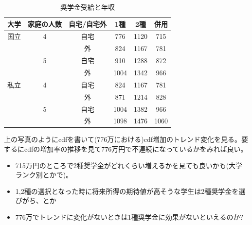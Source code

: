 \documentclass{jsarticle}
\begin{document}
\begin{table}[htb]
\begin{center}
\caption{奨学金受給と年収}
  \begin{tabular}{cccccc} \hline
   大学 & 家庭の人数 & 自宅/自宅外 & 1種    &2種      &併用 \\ \hline \hline
   国立 &      4            &自宅           & 776   & 1120   &715 \\
           &                    & 外          & 824   &1167    &781\\
           &      5            & 自宅          & 910   & 1288   &872 \\ 
           &                    & 外          & 1004 & 1342   & 966 \\  \hline
   私立 &      4            &自宅           & 824   & 1167   &781 \\
           &                    & 外          & 871   &1214    &828\\
           &      5            & 自宅          & 1004 & 1382   &966\\ 
           &                    & 外         & 1098 & 1476   &1060\\  \hline  
           \end{tabular}   
   \end{center}
\end{table}

\begin{figure}[htbp]
\begin{center}
  \end{center}
\end{figure}

上の写真のようにcdfを書いて(776万における)cdf増加のトレンド変化を見る。要するにcdfの増加率の推移を見て776万円で不連続になっているかをみれば良い。
\begin{itemize}
\item 715万円のところで2種奨学金がどれくらい増えるかを見ても良いかも(大学ランク別とかで)。
\item 1,2種の選択となった時に将来所得の期待値が高そうな学生は2種奨学金を選びがち、とか
\item 776万でトレンドに変化がないときは1種奨学金に効果がないといえるのか?
\end{itemize}

	
\end{document}
